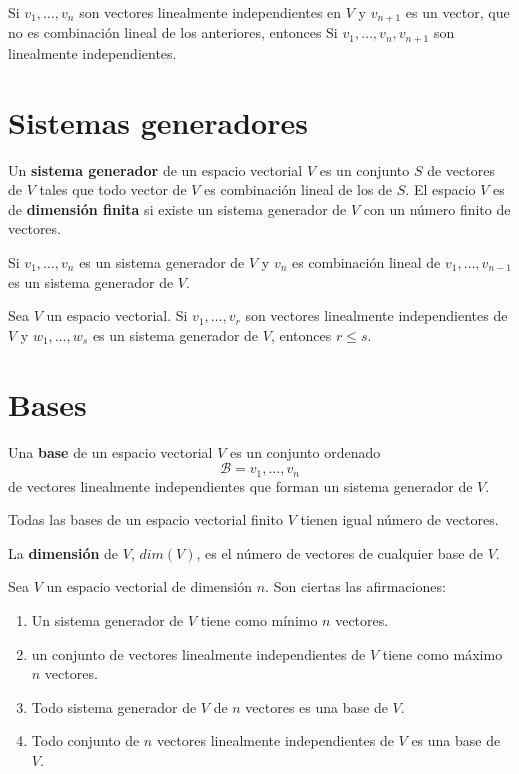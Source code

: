 \begin{prop}
	Si $v_1,\ldots,v_n$ son vectores linealmente independientes en $V$ y $v_{n+1}$ es un vector, que no es combinación lineal de los anteriores, entonces Si $v_1,\ldots,v_n,v_{n+1}$ son linealmente independientes.
\end{prop}

\section{Sistemas generadores}

\begin{defi}
	Un \textbf{sistema generador} de un espacio vectorial $V$ es un conjunto $S$ de vectores de $V$ tales que todo vector de $V$ es combinación lineal de los de $S$. El espacio $V$ es de \textbf{dimensión finita} si existe un sistema generador de $V$ con un número finito de vectores.
\end{defi}

\begin{prop}
	Si ${v_1,\ldots,v_n}$ es un sistema generador de $V$ y $v_n$ es combinación lineal de $v_1,\ldots,v_{n-1}$ es un sistema generador de $V$.
\end{prop}

\begin{prop}
	Sea $V$ un espacio vectorial. Si ${v_1,\ldots,v_r}$ son vectores linealmente independientes de $V$ y ${w_1,\ldots,w_s}$ es un sistema generador de $V$, entonces $r \leq s$.
\end{prop}

\section{Bases}

\begin{defi}
	Una \textbf{base} de un espacio vectorial $V$ es un conjunto ordenado
	\[
	\mathcal{B}={v_1,\ldots,v_n}
	\]
	de vectores linealmente independientes que forman un sistema generador de $V$.
\end{defi}

\begin{theorem}
	Todas las bases de un espacio vectorial finito $V$ tienen igual número de vectores.
\end{theorem}

La \textbf{dimensión} de $V$, $dim(V)$, es el número de vectores de cualquier base de $V$.


\begin{prop}
Sea $V$ un espacio vectorial de dimensión $n$. Son ciertas las afirmaciones:
\begin{enumerate}
	\item Un sistema generador de $V$ tiene como mínimo $n$ vectores.
	\item un conjunto de vectores linealmente independientes de $V$ tiene como máximo $n$ vectores.
	\item Todo sistema generador de $V$ de $n$ vectores es una base de $V$.
	\item Todo conjunto de $n$ vectores linealmente independientes de $V$ es una base de $V$.
\end{enumerate}
\end{prop}

